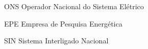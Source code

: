 \documentclass[
  12pt,				                                                                                                          %
  oneside,                                                                                                              %
  a4paper,			                                                                                                        %
  chapter = Title,		                                                                                                  %
  section = Title,		                                                                                                  %
  subsection = Title,	                                                                                                  %
  english,			                                                                                                        %
  brazil,			                                                                                                          %
  sumario = tradicional
  ]{abntex2-uff}
\begin{document}
\frenchspacing                                                                                                          %

{\Large \imprimircapa}

\imprimirfolhaderosto








%



\renewcommand{\listfigurename}{}                                                                                        %
\listoffigures*                                                                                                         %
\cleardoublepage

\renewcommand{\listtablename}{}
\listoftables*
\cleardoublepage

\begin{siglas}
  \item[ONS] Operador Nacional do Sistema Elétrico
  \item[EPE] Empresa de Pesquisa Energética
  \item[SIN] Sistema Interligado Nacional
  \item[] 
\end{siglas}

\renewcommand{\contentsname}{}	%
\tableofcontents*
\cleardoublepage

\textual
\end{document}
